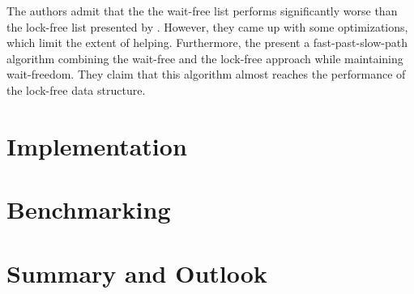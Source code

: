 \documentclass[a4paper, 12t]{article}
\begin{document}
The authors admit that the the wait-free list performs significantly worse than the lock-free list presented by \cite{harris01}. However, they came up with some optimizations, which limit the extent of helping. Furthermore, the present a fast-past-slow-path algorithm combining the wait-free and the lock-free approach while maintaining wait-freedom. They claim that this algorithm almost reaches the performance of the lock-free data structure. 

\section{Implementation}





\section{Benchmarking}





\section{Summary and Outlook}

\sloppy
\printbibliography
\end{document}
